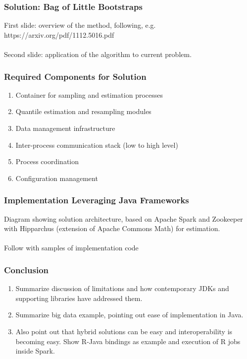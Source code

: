 \documentclass[14pt,mathserif]{beamer}
\begin{document}
\begin{frame}
  \frametitle{Solution: Bag of Little Bootstraps}
  First slide: overview of the method, following, e.g. 
  https://arxiv.org/pdf/1112.5016.pdf
  \\
  \\
  Second slide: application of the algorithm to current problem.
\end{frame} 

\begin{frame}
  \frametitle{Required Components for Solution}
  \begin{enumerate}
  \item Container for sampling and estimation processes
  \item Quantile estimation and resampling modules
  \item Data management infrastructure
  \item Inter-process communication stack (low to high level)
  \item Process coordination
  \item Configuration management
  \end{enumerate}
\end{frame}
  
\begin{frame}
  \frametitle{Implementation Leveraging Java Frameworks}
Diagram showing solution architecture, based on Apache Spark and Zookeeper with Hipparchus (extension of Apache Commons Math) for estimation.
\\
\\
Follow with samples of implementation code
\end{frame}

\begin{frame}
  \frametitle{Conclusion}
\begin{enumerate}
\item Summarize discussion of limitations and how contemporary JDKs and supporting libraries have addressed them.
\item Summarize big data example, pointing out ease of implementation in Java.  
\item Also point out that hybrid solutions can be easy and interoperability is becoming easy.  Show R-Java bindings as example and execution of R jobs inside Spark.
\end{enumerate}
\end{frame}
\end{document}

